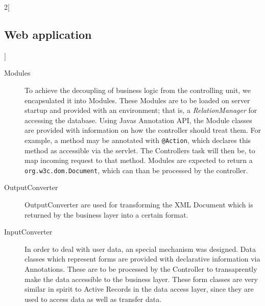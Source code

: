 \begin{multicols}{2}[\subsection{Web application}]
\begin{description}
\item[Modules] To achieve the decoupling of business logic from the controlling unit, we encapsulated it into Modules. These Modules are to be loaded on server startup and provided with an environment; that is, a \emph{RelationManager} for accessing the database. Using Javas Annotation API, the Module classes are provided with information on how the controller should treat them. For example, a method may be annotated with \texttt{@Action}, which declares this method as accessible via the servlet. The Controllers task will then be, to map incoming request to that method. Modules are expected to return a \texttt{org.w3c.dom.Document}, which can than be processed by the controller.

\item[OutputConverter] OutputConverter are used for transforming the XML Document which is returned by the business layer into a certain format.

\item[InputConverter] In order to deal with user data, an special mechanism was designed. Data classes which represent forms are provided with declarative information via Annotations. These are to be processed by the Controller to transaprently make the data accessible to the business layer. These form classes are very similar in spirit to Active Records in the data access layer, since they are used to access data as well as transfer data.

\end{description}

\end{multicols}
